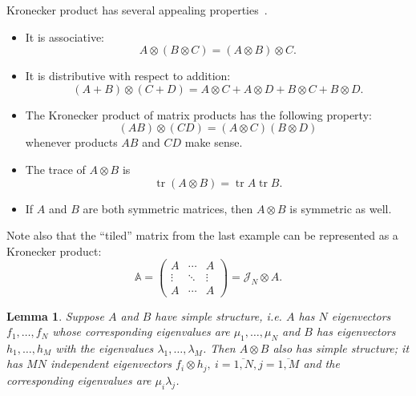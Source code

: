\documentclass[14pt,a4paper]{extarticle}
\newtheorem{lem}{Lemma}
\theoremstyle{definition}
\begin{document}

Kronecker product has several appealing properties~\cite{bellman-matrices-kron}.
\begin{itemize}
\item It is associative:
    \[ A\otimes (B\otimes C) = (A\otimes B)\otimes C. \]
\item It is distributive with respect to addition:
    \[ (A+B)\otimes(C+D) = A\otimes C + A\otimes D + B\otimes C + B\otimes D. \]
\item The Kronecker product of matrix products has the following property:
    \[ (AB)\otimes(CD) = (A\otimes C)(B\otimes D) \]
    whenever products \( AB \) and \( CD \) make sense.
\item The trace of \( A\otimes B \) is \[ \operatorname{tr}(A\otimes B) = \operatorname{tr}A\operatorname{tr}B. \]
\item If \( A \) and \( B \) are both symmetric matrices,
      then \( A\otimes B \) is symmetric as well.
\end{itemize}
Note also that the ``tiled'' matrix from the last example
    can be represented as a Kronecker product:
\[
    \mathbb{A} =
    \begin{pmatrix}
    A & \cdots & A\\
    \vdots & \ddots & \vdots \\
    A & \cdots & A\end{pmatrix} =
        \mathcal{J}_N\otimes A.
    \]

\begin{lem}
Suppose \( A \) and \( B \) have simple structure,
    i.e. \( A \) has \( N \) eigenvectors
    \( f_1, \ldots, f_N \)
    whose corresponding eigenvalues are \( \mu_1, \ldots, \mu_N \)
    and \( B \) has eigenvectors \( h_1, \ldots, h_M \)
    with the eigenvalues \( \lambda_1, \ldots, \lambda_M \).
Then \( A\otimes B \) also has simple structure;
    it has \( MN \) independent eigenvectors \( f_i\otimes h_j,\ i{=}\overline{1,N}, j{=}\overline{1,M} \)
    and the corresponding eigenvalues are \( \mu_i \lambda_j \).
\end{lem}
\end{document}
